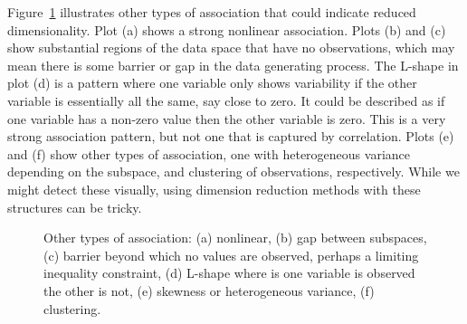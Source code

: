 \documentclass[
  letterpaper,
]{krantz}
\begin{document}
Figure~\ref{fig-nonlin-2D} illustrates other types of association that
could indicate reduced dimensionality. Plot (a) shows a strong nonlinear
association. Plots (b) and (c) show substantial regions of the data
space that have no observations, which may mean there is some barrier or
gap in the data generating process. The L-shape in plot (d) is a pattern
where one variable only shows variability if the other variable is
essentially all the same, say close to zero. It could be described as if
one variable has a non-zero value then the other variable is zero. This
is a very strong association pattern, but not one that is captured by
correlation. Plots (e) and (f) show other types of association, one with
heterogeneous variance depending on the subspace, and clustering of
observations, respectively. While we might detect these visually, using
dimension reduction methods with these structures can be tricky.

\begin{figure}


\caption{\label{fig-nonlin-2D}Other types of association: (a) nonlinear,
(b) gap between subspaces, (c) barrier beyond which no values are
observed, perhaps a limiting inequality constraint, (d) L-shape where is
one variable is observed the other is not, (e) skewness or heterogeneous
variance, (f) clustering.}

\end{figure}%
\end{document}
